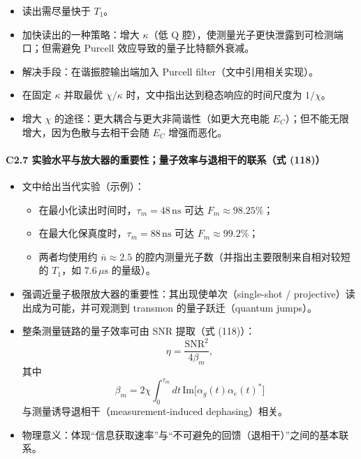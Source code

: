 \documentclass[12pt,a4paper,oneside]{ctexbook}
\providecommand{\tightlist}{%
  \setlength{\itemsep}{0pt}\setlength{\parskip}{0pt}}
\let\oldparagraph\paragraph
\renewcommand{\paragraph}[1]{\oldparagraph{#1}\mbox{}}
\begin{document}
\begin{itemize}
\tightlist
\item
  读出需尽量快于 \(T_1\)。
\item
  加快读出的一种策略：增大 \(\kappa\)（低 Q
  腔），使测量光子更快泄露到可检测端口；但需避免 Purcell
  效应导致的量子比特额外衰减。
\item
  解决手段：在谐振腔输出端加入 Purcell filter（文中引用相关实现）。
\item
  在固定 \(\kappa\) 并取最优 \(\chi/\kappa\)
  时，文中指出达到稳态响应的时间尺度为 \(1/\chi\)。
\item
  增大 \(\chi\) 的途径：更大耦合与更大非简谐性（如更大充电能
  \(E_C\)）；但不能无限增大，因为色散与去相干会随 \(E_C\) 增强而恶化。
\end{itemize}

\paragraph{C2.7 实验水平与放大器的重要性；量子效率与退相干的联系（式
(118)）}\label{c2.7-ux5b9eux9a8cux6c34ux5e73ux4e0eux653eux5927ux5668ux7684ux91cdux8981ux6027ux91cfux5b50ux6548ux7387ux4e0eux9000ux76f8ux5e72ux7684ux8054ux7cfbux5f0f-118}

\begin{itemize}
\tightlist
\item
  文中给出当代实验（示例）：

  \begin{itemize}
  \tightlist
  \item
    在最小化读出时间时，\(\tau_m=48\,\mathrm{ns}\) 可达
    \(F_m\approx 98.25\%\)；
  \item
    在最大化保真度时，\(\tau_m=88\,\mathrm{ns}\) 可达
    \(F_m\approx 99.2\%\)；
  \item
    两者均使用约 \(\bar{n}\approx 2.5\)
    的腔内测量光子数（并指出主要限制来自相对较短的 \(T_1\)，如
    \(7.6\,\mu\mathrm{s}\) 的量级）。
  \end{itemize}
\item
  强调近量子极限放大器的重要性：其出现使单次（single-shot /
  projective）读出成为可能，并可观测到 transmon 的量子跃迁（quantum
  jumps）。
\item
  整条测量链路的量子效率可由 SNR 提取（式 (118)）： \[
  \eta=\frac{\mathrm{SNR}^2}{4\beta_m},
  \] 其中 \[
  \beta_m=2\chi\int_0^{\tau_m}dt\,\mathrm{Im}\!\Big[\alpha_g(t)\alpha_e(t)^*\Big]
  \] 与测量诱导退相干（measurement-induced dephasing）相关。
\item
  物理意义：体现``信息获取速率''与``不可避免的回馈（退相干）''之间的基本联系。
\end{itemize}
\end{document}
